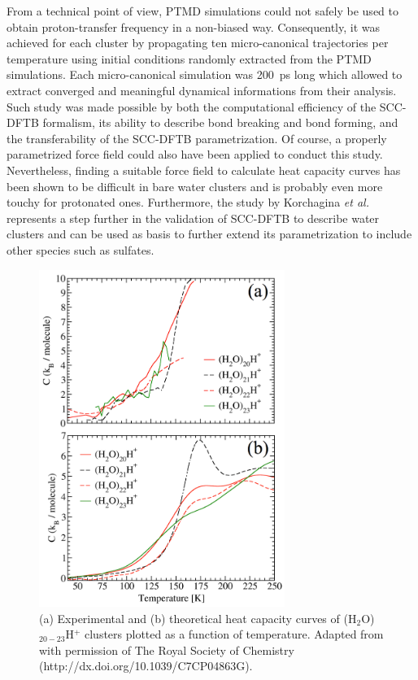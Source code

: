 \documentclass[]{interact}
\theoremstyle{plain}%
\theoremstyle{definition}
\theoremstyle{remark}
\begin{document}
From a technical point of view, PTMD simulations could not safely be used to obtain proton-transfer frequency in a non-biased way.
Consequently, it was achieved for each cluster by propagating ten micro-canonical trajectories per temperature using initial conditions
randomly extracted from the PTMD simulations. Each micro-canonical simulation was 200~ps long which allowed to extract converged
and meaningful dynamical informations from their analysis. Such study was made possible by both the computational efficiency of the
SCC-DFTB formalism, its ability to describe bond breaking and bond forming, and the transferability of the SCC-DFTB parametrization.
Of course, a properly parametrized force field could also have been applied to conduct this study. Nevertheless, finding a suitable force
field to calculate heat capacity curves has been shown to be difficult in bare water clusters \cite{Pedulla1998,Douady2009} and is probably
even more touchy for protonated ones. Furthermore, the study by Korchagina \textit{et al.} represents a step further in the validation of
SCC-DFTB to describe water clusters and can be used as basis to further extend its parametrization to include other species such as sulfates.


\begin{figure}
\begin{center}
\includegraphics[width=8cm]{Capa.png}
\end{center}
\caption{(a) Experimental and (b) theoretical heat capacity curves of (H$_{2}$O)$_{20-23}$H$^{+}$ clusters plotted as a function of temperature.
Adapted from \cite{Korchagina2017} with permission of The Royal Society of Chemistry (http://dx.doi.org/10.1039/C7CP04863G).}
\label{capa}
\end{figure}
\end{document}
